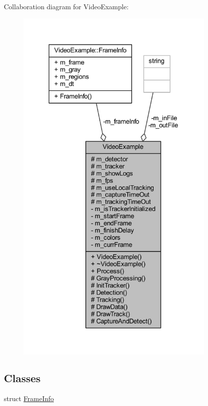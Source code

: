 Collaboration diagram for Video\+Example\+:\nopagebreak
\begin{figure}[H]
\begin{center}
\leavevmode
\includegraphics[width=280pt]{class_video_example__coll__graph}
\end{center}
\end{figure}
\subsection*{Classes}
\begin{DoxyCompactItemize}
\item 
struct \mbox{\hyperlink{struct_video_example_1_1_frame_info}{Frame\+Info}}
\end{DoxyCompactItemize}
